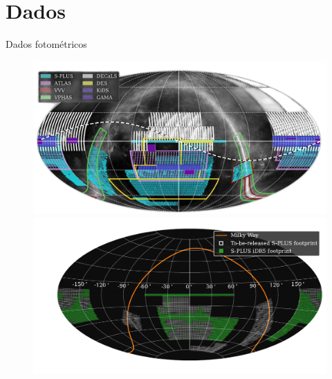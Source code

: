 \section{Dados}

\begin{frame}[c]{Dados fotométricos}
    \begin{figure}
        \centering
        \begin{minipage}{0.48\textwidth}
            \centering
            \includegraphics[width=\textwidth]{images/splus_survey_area.png}
        \end{minipage}
        \hfill
        \begin{minipage}{0.48\textwidth}
            \centering
            \includegraphics[width=\textwidth]{script/images/splus_footprint_idr5.pdf}
        \end{minipage}
    \end{figure}
\end{frame}

